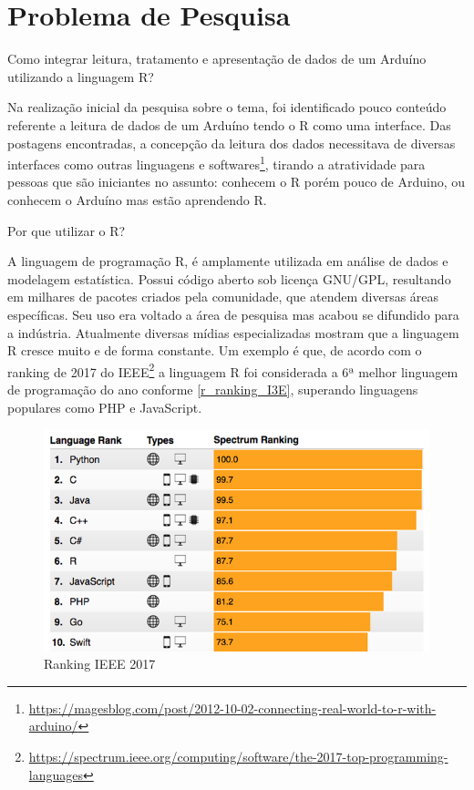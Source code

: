 \chapter[Problema de Pesquisa]{Problema de Pesquisa}

Como integrar leitura, tratamento e apresentação de dados de um Arduíno 
utilizando a linguagem R? 

Na realização inicial da pesquisa sobre o tema, foi identificado
pouco conteúdo referente a leitura de dados de um Arduíno tendo o R como uma
interface. Das postagens encontradas, a concepção da leitura dos dados 
necessitava de diversas 
interfaces
como outras linguagens e softwares\footnote{\url{https://magesblog.com/post/2012-10-02-connecting-real-world-to-r-with-arduino/}}, tirando a atratividade para pessoas que são 
iniciantes no assunto: conhecem o R porém pouco de Arduino, ou conhecem o 
Arduíno mas estão aprendendo R.

Por que utilizar o R?

A linguagem de programação R, é amplamente utilizada em análise de dados e modelagem estatística. Possui 
código aberto sob licença GNU/GPL, resultando em milhares de pacotes criados 
pela comunidade, que atendem diversas áreas específicas. Seu uso era voltado 
a área de pesquisa mas acabou se difundido para a indústria. Atualmente 
diversas mídias especializadas mostram que a linguagem R cresce muito e de 
forma constante. Um exemplo é que, de acordo com o ranking de 2017 do 
IEEE\footnote{\url{https://spectrum.ieee.org/computing/software/the-2017-top-programming-languages}}
a linguagem R foi considerada a 6ª melhor linguagem de programação do ano conforme 
\autoref{r_ranking_I3E}, superando linguagens populares como PHP e 
JavaScript.

\begin{figure}[htb]
 \caption{\label{r_ranking_I3E} Ranking IEEE 2017}
 \begin{center}
  \includegraphics[scale = 0.4]{img/r_ranking_I3E.jpeg}
 \end{center}
\end{figure}

